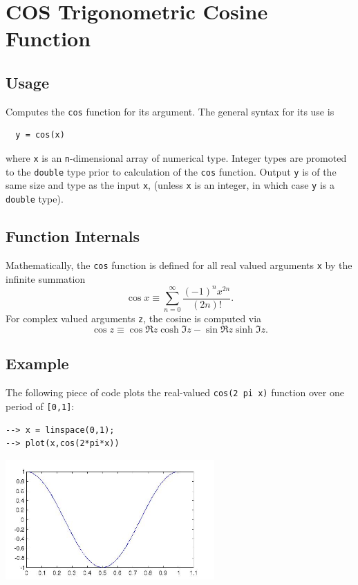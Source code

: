 \section{COS Trigonometric Cosine Function}

\subsection{Usage}

Computes the \verb|cos| function for its argument.  The general
syntax for its use is
\begin{verbatim}
  y = cos(x)
\end{verbatim}
where \verb|x| is an \verb|n|-dimensional array of numerical type.
Integer types are promoted to the \verb|double| type prior to
calculation of the \verb|cos| function.  Output \verb|y| is of the
same size and type as the input \verb|x|, (unless \verb|x| is an
integer, in which case \verb|y| is a \verb|double| type).  
\subsection{Function Internals}

Mathematically, the \verb|cos| function is defined for all real
valued arguments \verb|x| by the infinite summation
\[
  \cos x \equiv \sum_{n=0}^{\infty} \frac{(-1)^n x^{2n}}{(2n)!}.
\]
For complex valued arguments \verb|z|, the cosine is computed via
\[
  \cos z \equiv \cos \Re z \cosh \Im z - \sin \Re z
  \sinh \Im z.
\]
\subsection{Example}

The following piece of code plots the real-valued \verb|cos(2 pi x)|
function over one period of \verb|[0,1]|:
\begin{verbatim}
--> x = linspace(0,1);
--> plot(x,cos(2*pi*x))
\end{verbatim}


\centerline{\includegraphics[width=8cm]{cosplot}}

